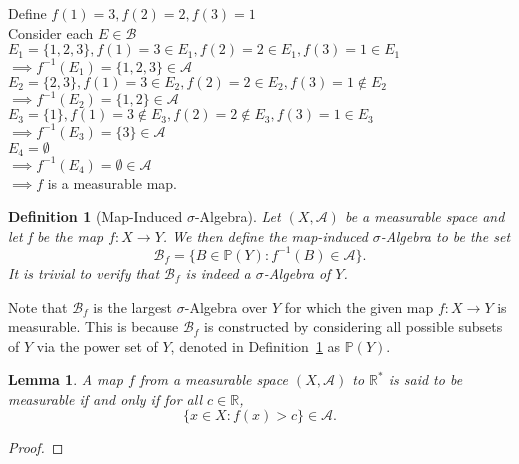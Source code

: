 \documentclass[10pt, oneside]{article}
\newcommand{\R}{\mathbb{R}}
\newtheorem{defn}{Definition}
\newtheorem{lem}{Lemma}
\begin{document}
Define $f(1)=3,f(2)=2,f(3)=1$\\
Consider each $E\in \mathcal{B}$ \\
$E_1=\{1,2,3\},f(1)=3\in E_1,f(2)=2\in E_1,f(3)=1\in E_1$\\ $\implies f^{-1}(E_1)=\{1,2,3\}\in \mathcal{A}$ \checkmark\\

$E_2=\{2,3\},f(1)=3\in E_2,f(2)=2\in E_2,f(3)=1\notin E_2$\\ $\implies f^{-1}(E_2)=\{1,2\}\in \mathcal{A}$ \checkmark\\

$E_3=\{1\},f(1)=3\notin E_3,f(2)=2\notin E_3, f(3)=1\in E_3$\\ $\implies f^{-1}(E_3)=\{3\}\in \mathcal{A}$ \checkmark\\

$E_4=\emptyset$\\ $\implies f^{-1}(E_4)=\emptyset\in \mathcal{A}$ \checkmark\\

$\implies f$ is a measurable map. 

\begin{defn}[Map-Induced $\sigma$-Algebra]
    \label{defn:map-ind-SA}
    Let $(X,\mathcal{A})$ be a measurable space and let f be the map $f \colon X 
    \to Y$. We then define the map-induced $\sigma$-Algebra to be the set 
    \[\mathcal{B}_f = \{B \in \mathbb{P}(Y) \colon f^{-1}(B) \in \mathcal{A}\}. \]
    It is trivial to verify that $\mathcal{B}_f$ is indeed a $\sigma$-Algebra of $Y$. 
\end{defn}

Note that $\mathcal{B}_f$ is the largest $\sigma$-Algebra over $Y$ for which the 
given map $f \colon X \to Y$ is measurable. This is because $\mathcal{B}_f$ is 
constructed by considering all possible subsets of $Y$ via the power set of $Y$, 
denoted in Definition~\ref{defn:map-ind-SA} as $\mathbb{P}(Y)$. 

\begin{lem}
    A map $f$ from a measurable space $(X,\mathcal{A})$ to $\R^{*}$ is said to be 
    measurable if and only if for all $c \in \R$, 
    \[\{x \in X \colon f(x) > c\} \in \mathcal{A}. \]
\end{lem}

\begin{proof}
    
\end{proof}
\end{document}
